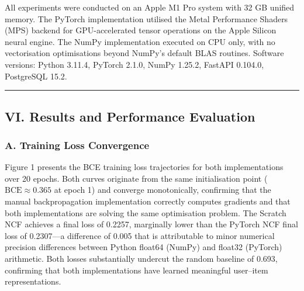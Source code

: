 \documentclass[
]{IEEEtran}
\begin{document}
All experiments were conducted on an Apple M1 Pro system with 32 GB
unified memory. The PyTorch implementation utilised the Metal
Performance Shaders (MPS) backend for GPU-accelerated tensor operations
on the Apple Silicon neural engine. The NumPy implementation executed on
CPU only, with no vectorisation optimisations beyond NumPy's default
BLAS routines. Software versions: Python 3.11.4, PyTorch 2.1.0, NumPy
1.25.2, FastAPI 0.104.0, PostgreSQL 15.2.

\begin{center}\rule{0.5\linewidth}{0.5pt}\end{center}

\subsection{VI. Results and Performance
Evaluation}\label{vi.-results-and-performance-evaluation}

\subsubsection{A. Training Loss
Convergence}\label{a.-training-loss-convergence}

Figure 1 presents the BCE training loss trajectories for both
implementations over 20 epochs. Both curves originate from the same
initialisation point (\(\text{BCE} \approx 0.365\) at epoch 1) and
converge monotonically, confirming that the manual backpropagation
implementation correctly computes gradients and that both
implementations are solving the same optimisation problem. The Scratch
NCF achieves a final loss of 0.2257, marginally lower than the PyTorch
NCF final loss of 0.2307---a difference of 0.005 that is attributable to
minor numerical precision differences between Python float64 (NumPy) and
float32 (PyTorch) arithmetic. Both losses substantially undercut the
random baseline of 0.693, confirming that both implementations have
learned meaningful user--item representations.
\end{document}

